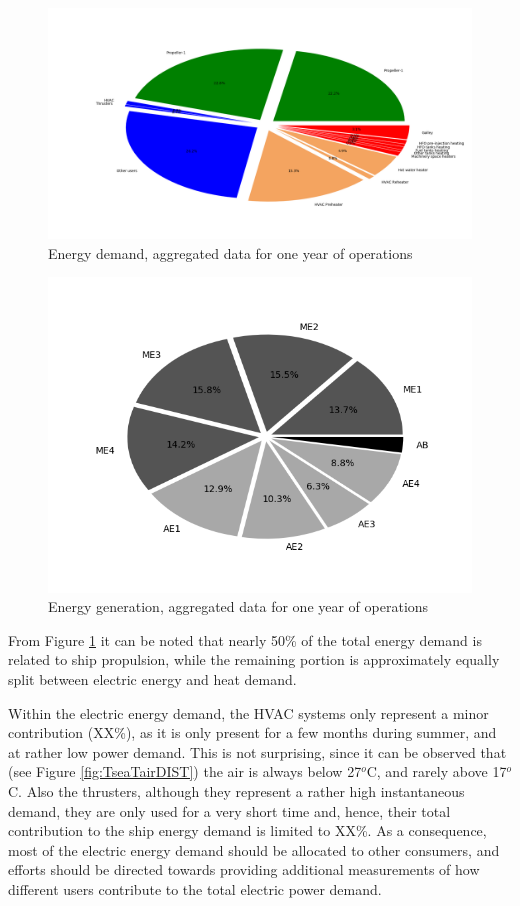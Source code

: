 \documentclass[preprint,12pt]{elsarticle}
\begin{document}
\begin{figure}[htbp]
	\centering
	\includegraphics[width=0.9\linewidth]{Figures/Pie_EnergyDemand}
	\caption{Energy demand, aggregated data for one year of operations}
	\label{fig:Pie_EnergyDemand}
\end{figure}

\begin{figure}
	\centering
	\includegraphics[width=0.9\linewidth]{Figures/Pie_EnergyGeneration}
	\caption{Energy generation, aggregated data for one year of operations}
	\label{fig:Pie_EnergyGeneration}
\end{figure}

From Figure \ref{fig:Pie_EnergyDemand} it can be noted that nearly 50\% of the total energy demand is related to ship propulsion, while the remaining portion is approximately equally split between electric energy and heat demand.

Within the electric energy demand, the HVAC systems only represent a minor contribution (XX\%), as it is only present for a few months during summer, and at rather low power demand. This is not surprising, since it can be observed that (see Figure \ref{fig:TseaTairDIST}) the air is always below 27$^o$C, and rarely above 17$^o$C. Also the thrusters, although they represent a rather high instantaneous demand, they are only used for a very short time and, hence, their total contribution to the ship energy demand is limited to XX\%. As a consequence, most of the electric energy demand should be allocated to other consumers, and efforts should be directed towards providing additional measurements of how different users contribute to the total electric power demand.
\end{document}
